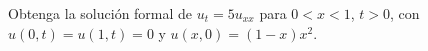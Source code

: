 Obtenga la solución formal de $u_t=5u_{xx}$ para $0<x<1$, $t>0$, con $u(0,t)=u(1,t)=0$ y $u(x,0)=(1-x)x^2$.
